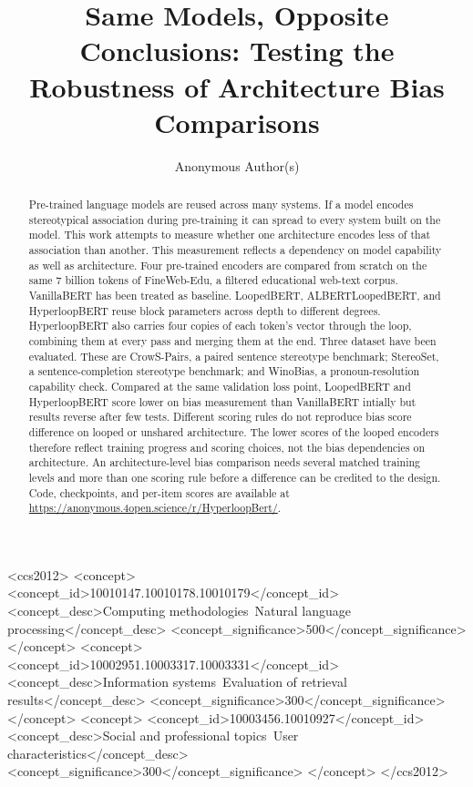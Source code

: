 \documentclass[sigconf,natbib=true,anonymous=true]{acmart}
\begin{document}
\title{Same Models, Opposite Conclusions: Testing the Robustness of
       Architecture Bias Comparisons}

\author{Anonymous Author(s)}

\begin{abstract}
Pre-trained language models are reused across many systems. If a model encodes stereotypical association during pre-training it can spread to every system built on the model. This work attempts to measure whether one architecture encodes less of that association than another. This measurement reflects a dependency on model capability as well as architecture. Four pre-trained  encoders are compared from scratch on the same 7 billion tokens of FineWeb-Edu, a filtered educational web-text corpus. VanillaBERT has been treated as baseline. LoopedBERT, ALBERTLoopedBERT, and HyperloopBERT reuse block parameters across depth to different degrees. HyperloopBERT also carries four copies of each token's vector through the loop, combining them at every pass and merging them at the end. Three dataset have been evaluated. These are CrowS-Pairs, a paired sentence stereotype benchmark; StereoSet, a sentence-completion stereotype benchmark; and WinoBias, a pronoun-resolution capability check. Compared at the same validation loss point, LoopedBERT and HyperloopBERT score lower on bias measurement than VanillaBERT intially but results reverse after few tests. Different scoring rules do not reproduce bias score difference on looped or unshared architecture. The lower scores of the looped encoders therefore reflect training progress and scoring choices, not the bias dependencies on architecture. An architecture-level bias comparison needs several matched training levels and more than one scoring rule before a difference can be credited to the design.
Code, checkpoints, and per-item scores are available at \url{https://anonymous.4open.science/r/HyperloopBert/}.
\end{abstract}

\begin{CCSXML}
<ccs2012>
<concept>
<concept_id>10010147.10010178.10010179</concept_id>
<concept_desc>Computing methodologies~Natural language processing</concept_desc>
<concept_significance>500</concept_significance>
</concept>
<concept>
<concept_id>10002951.10003317.10003331</concept_id>
<concept_desc>Information systems~Evaluation of retrieval results</concept_desc>
<concept_significance>300</concept_significance>
</concept>
<concept>
<concept_id>10003456.10010927</concept_id>
<concept_desc>Social and professional topics~User characteristics</concept_desc>
<concept_significance>300</concept_significance>
</concept>
</ccs2012>
\end{CCSXML}
\end{document}
